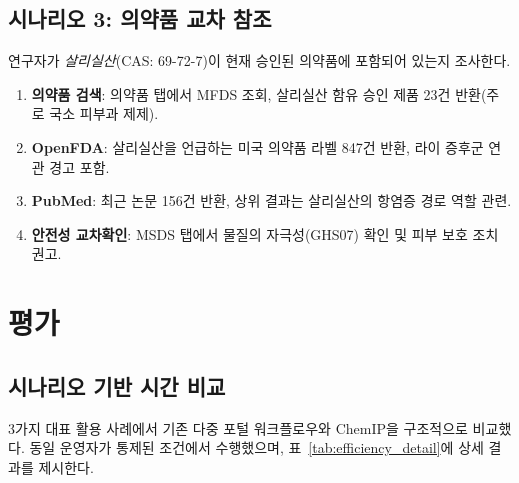 \documentclass[preprint,12pt]{elsarticle}
\begin{document}
\subsection{시나리오 3: 의약품 교차 참조}

연구자가 \emph{살리실산}(CAS: 69-72-7)이 현재 승인된 의약품에 포함되어 있는지 조사한다.

\begin{enumerate}
  \item \textbf{의약품 검색}: 의약품 탭에서 MFDS 조회, 살리실산 함유 승인 제품 23건 반환(주로 국소 피부과 제제).
  \item \textbf{OpenFDA}: 살리실산을 언급하는 미국 의약품 라벨 847건 반환, 라이 증후군 연관 경고 포함.
  \item \textbf{PubMed}: 최근 논문 156건 반환, 상위 결과는 살리실산의 항염증 경로 역할 관련.
  \item \textbf{안전성 교차확인}: MSDS 탭에서 물질의 자극성(GHS07) 확인 및 피부 보호 조치 권고.
\end{enumerate}

\section{평가}
\label{sec:evaluation}

\subsection{시나리오 기반 시간 비교}

3가지 대표 활용 사례에서 기존 다중 포털 워크플로우와 ChemIP을 구조적으로 비교했다. 동일 운영자가 통제된 조건에서 수행했으며, 표~\ref{tab:efficiency_detail}에 상세 결과를 제시한다.
\end{document}
